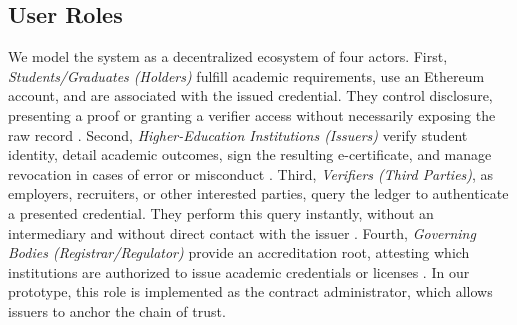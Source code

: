 \documentclass[conference]{IEEEtran}
\begin{document}
\subsection{User Roles}
We model the system as a decentralized ecosystem of four actors. First, \emph{Students/Graduates (Holders)} fulfill academic requirements, use an Ethereum account, and are associated with the issued credential. They control disclosure, presenting a proof or granting a verifier access without necessarily exposing the raw record \cite{slr_certificate,berrios_zkbar}. Second, \emph{Higher-Education Institutions (Issuers)} verify student identity, detail academic outcomes, sign the resulting e-certificate, and manage revocation in cases of error or misconduct \cite{berrios_zkbar,cheng_smartcontract,rustemi_diar}. Third, \emph{Verifiers (Third Parties)}, as employers, recruiters, or other interested parties, query the ledger to authenticate a presented credential. They perform this query instantly, without an intermediary and without direct contact with the issuer \cite{cheng_smartcontract}. Fourth, \emph{Governing Bodies (Registrar/Regulator)} provide an accreditation root, attesting which institutions are authorized to issue academic credentials or licenses \cite{alhemairy_uae}. In our prototype, this role is implemented as the contract administrator, which allows issuers to anchor the chain of trust.

\end{document}
